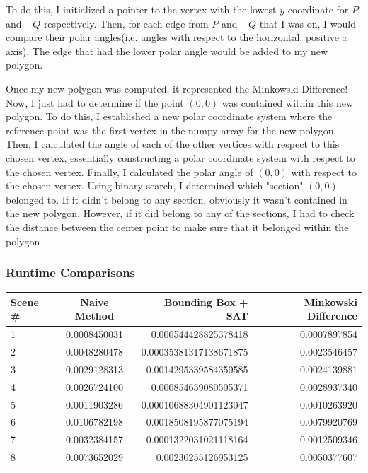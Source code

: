 \documentclass{article}
\begin{document}
To do this, I initialized a pointer to the vertex with the lowest $y$ coordinate for $P$ and $-Q$ respectively. Then, for each edge from $P$ and $-Q$ that I was on, I would compare their polar angles(i.e. angles with respect to the horizontal, positive $x$ axis). The edge that had the lower polar angle would be added to my new polygon. \newline 

Once my new polygon was computed, it represented the Minkowski Difference! Now, I just had to determine if the point $(0,0)$ was contained within this new polygon. To do this, I established a new polar coordinate system where the reference point was the first vertex in the numpy array for the new polygon. Then, I calculated the angle of each of the other vertices with respect to this chosen vertex, essentially constructing a polar coordinate system with respect to the chosen vertex. Finally, I calculated the polar angle of $(0,0)$ with respect to the chosen vertex. Using binary search, I determined which "section" $(0,0)$ belonged to. If it didn't belong to any section, obviously it wasn't contained in the new polygon. However, if it did belong to any of the sections, I had to check the distance between the center point to make sure that it belonged within the polygon

\subsubsection{Runtime Comparisons}

\begin{tabular}{|l|c|r|r|}
  \hline
  Scene \# & Naive Method & Bounding Box + SAT & Minkowski Difference \\
  \hline
  1 & 0.0008450031 & 0.000544428825378418 & 0.0007897854 \\
2 & 0.0048280478 & 0.00035381317138671875 & 0.0023546457 \\
3 & 0.0029128313 & 0.0014295339584350585 & 0.0024139881 \\
4 & 0.0026724100 & 0.000854659080505371 & 0.0028937340 \\
5 & 0.0011903286 & 0.00010688304901123047 & 0.0010263920 \\
6 & 0.0106782198 & 0.0018508195877075194 & 0.0079920769 \\
7 & 0.0032384157 & 0.0001322031021118164 & 0.0012509346 \\
8 & 0.0073652029 & 0.00230255126953125 & 0.0050377607 \\
  \hline
\end{tabular} \newline 
\end{document}
